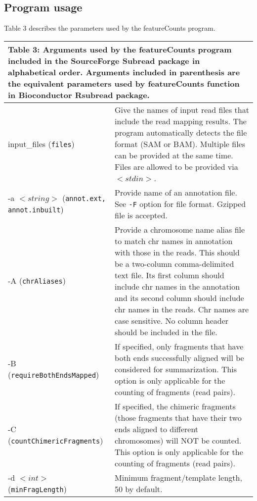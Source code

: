 \documentclass[12pt]{report}
\newcommand{\code}[1]{{\small\texttt{#1}}}
\newcommand{\Subread}{\textsf{Subread}}
\newcommand{\Rsubread}{\textsf{Rsubread}}
\newcommand{\featureCounts}{\textsf{featureCounts}}
\begin{document}
\subsection{Program usage}

Table 3 describes the parameters used by the {\featureCounts} program.

\pagebreak

\begin{longtable}{|p{5cm}|p{11cm}|}
\multicolumn{2}{p{16cm}}{Table 3: Arguments used by the {\featureCounts} program included in the SourceForge {\Subread} package in alphabetical order.
Arguments included in parenthesis are the equivalent parameters used by {\featureCounts} function in Bioconductor {\Rsubread} package.}
\endfirsthead
\hline
Arguments & Description \\
\hline
input\_files \newline (\code{files}) & Give the names of input read files that include the read mapping results. The program automatically detects the file format (SAM or BAM). Multiple files can be provided at the same time. Files are allowed to be provided via $<stdin>$. \\
\hline
-a $<string>$ \newline (\code{annot.ext, annot.inbuilt})  & Provide name of an annotation file. See \code{-F} option for file format. Gzipped file is accepted.\\
\hline
-A \newline (\code{chrAliases}) & Provide a chromosome name alias file to match chr names in annotation with those in the reads. This should be a two-column comma-delimited text file. Its first column should include chr names in the annotation and its second column should include chr names in the reads. Chr names are case sensitive. No column header should be included in the file.\\
\hline
-B \newline (\code{requireBothEndsMapped}) & If specified, only fragments that have both ends successfully aligned will be considered for summarization. This option is only applicable for the counting of fragments (read pairs).\\
\hline
-C \newline (\code{countChimericFragments}) & If specified, the chimeric fragments (those fragments that have their two ends aligned to different chromosomes) will NOT be counted. This option is only applicable for the counting of fragments (read pairs).\\
\hline
-d $<int>$ \newline (\code{minFragLength}) & Minimum fragment/template length, 50 by default.\\

\end{longtable}
\end{document}
